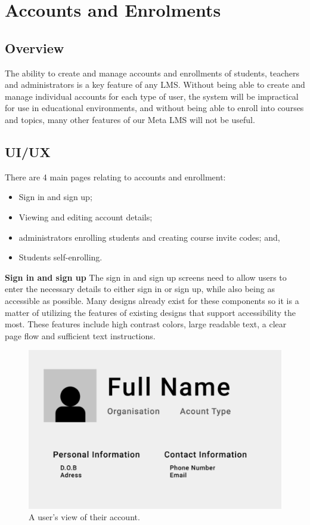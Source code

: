 \section{Accounts and Enrolments}
\subsection{Overview}
The ability to create and manage accounts and enrollments of students, teachers and administrators is a key feature of any LMS. Without being able to create and manage individual accounts for each type of user, the system will be impractical for use in educational environments, and without being able to enroll into courses and topics, many other features of our Meta LMS will not be useful.

\subsection{UI/UX}
There are 4 main pages relating to accounts and enrollment:
\begin{itemize}
  \item Sign in and sign up;
  \item Viewing and editing account details;
  \item administrators enrolling students and creating course invite codes; and,
  \item Students self-enrolling.
\end{itemize}

\textbf{Sign in and sign up}
The sign in and sign up screens need to allow users to enter the necessary details to either sign in or sign up, while also being as accessible as possible. Many designs already exist for these components so it is a matter of utilizing the features of existing designs that support accessibility the most. These features include high contrast colors, large readable text, a clear page flow and sufficient text instructions.

\begin{figure}[h!]
  \centering
  \includegraphics[scale=0.4]{images/accounts-profile}
  \caption{A user's view of their account.}
\end{figure}

